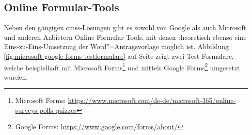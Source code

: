 \documentclass[a4paper,12pt,twoside]{scrreprt}
\begin{document}
\subsection{Online Formular-Tools}
\label{sub-sec:formular-tools}

Neben den gängigen \acp{cms}-Lösungen gibt es sowohl von Google als auch Microsoft und anderen Anbietern Online Formular-Tools, mit denen theoretisch ebenso eine Eins-zu-Eins-Umsetzung der Word"=Antragsvorlage möglich ist. Abbildung \ref{fig:microsoft-google-forms-testformulare} auf Seite \pageref{fig:microsoft-google-forms-testformulare} zeigt zwei Test-Formulare, welche beispielhaft mit Microsoft Forms\footnote{Microsoft Forms: \url{https://www.microsoft.com/de-de/microsoft-365/online-surveys-polls-quizzes}} und mittels Google Forms\footnote{Google Forms: \url{https://www.google.com/forms/about/}} umgesetzt wurden.
\end{document}
